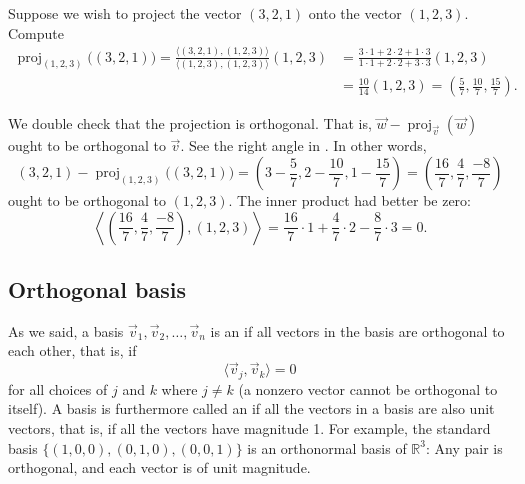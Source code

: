 \begin{example}
Suppose we wish to project the vector $(3,2,1)$ onto the vector $(1,2,3)$.
Compute
\begin{equation*}
\begin{split}
\operatorname{proj}_{(1,2,3)} \bigl( (3,2,1) \bigr)
=
\frac{\langle (3,2,1) , (1,2,3) \rangle}{\langle (1,2,3) , (1,2,3) \rangle}
(1,2,3)
& =
\frac{3 \cdot 1 + 2 \cdot 2 + 1 \cdot 3}{ 1 \cdot 1 + 2 \cdot 2 + 3 \cdot 3}
(1,2,3)
\\
& =
\frac{10}{14}
(1,2,3)
=
\left(\frac{5}{7},\frac{10}{7},\frac{15}{7}\right) .
\end{split}
\end{equation*}

We double check that the projection is orthogonal.  That is,
$\vec{w}-\operatorname{proj}_{\vec{v}}(\vec{w})$ ought to be orthogonal to
$\vec{v}$.
See the right angle in .  In other words,
\begin{equation*}
(3,2,1) - \operatorname{proj}_{(1,2,3)} \bigl( (3,2,1) \bigr)
=
\left(3-\frac{5}{7},2-\frac{10}{7},1-\frac{15}{7}\right)
=
\left(\frac{16}{7},\frac{4}{7},\frac{-8}{7}\right)
\end{equation*}
ought to be orthogonal to $(1,2,3)$.  The inner product had better be zero:
\begin{equation*}
\left\langle
\left(\frac{16}{7},\frac{4}{7},\frac{-8}{7}\right)
,
(1,2,3)
\right\rangle
=
\frac{16}{7} \cdot 1 + \frac{4}{7} \cdot 2 -\frac{8}{7} \cdot 3
=
0 .
\end{equation*}
\end{example}

\subsection{Orthogonal basis}

As we said, a basis $\vec{v}_1,\vec{v}_2,\ldots,\vec{v}_n$
is an \emph{} if all vectors in the
basis are orthogonal to each other, that is, if
\begin{equation*}
\langle \vec{v}_j , \vec{v}_k \rangle = 0
\end{equation*}
for all choices of $j$ and $k$ where $j \neq k$ (a nonzero vector cannot be
orthogonal to itself).
A basis is furthermore called an \emph{} if all
the vectors in a basis are also unit vectors, that is, if all the vectors
have magnitude 1.
For example, the standard basis $\{ (1,0,0), (0,1,0), (0,0,1) \}$ is an
orthonormal basis of ${\mathbb{R}}^3$:
Any pair is orthogonal, and each vector is of unit
magnitude.

